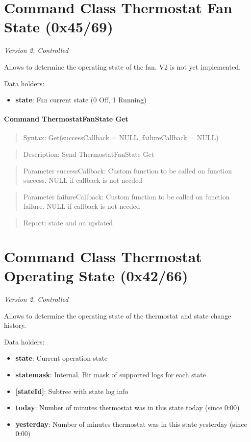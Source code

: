 \section{Command Class Thermostat Fan State (0x45/69)}

\textit{Version 2, Controlled}
\newline

Allows to determine the operating state of the fan. V2 is not yet implemented.
\newline

\noindent
Data holders:

\begin{itemize}
\item \textbf{state}: Fan current state (0 Off, 1 Running)
\end{itemize}

\paragraph{Command ThermostatFanState Get}
\begin{quote}Syntax: Get(successCallback = NULL, failureCallback = NULL)\end{quote}
\begin{quote}Description: Send ThermostatFanState Get\end{quote}
\begin{quote}Parameter successCallback: Custom function to be called on function success. NULL if callback is not needed\end{quote}
\begin{quote}Parameter failureCallback: Custom function to be called on function failure. NULL if callback is not needed\end{quote}
\begin{quote}Report: state and on updated\end{quote}


\section{Command Class Thermostat Operating State (0x42/66)}

\textit{Version 2, Controlled}
\newline

Allows to determine the operating state of the thermostat and state change history.
\newline

\noindent
Data holders:

\begin{itemize}
\item \textbf{state}: Current operation state
\item \textbf{statemask}: Internal. Bit mask of supported logs for each state
\item \textbf{[stateId]}: Subtree with state log info
\item \qquad\textbf{today}: Number of minutes thermostat was in this state today (since 0:00)
\item \qquad\textbf{yesterday}: Number of minutes thermostat was in this state yesterday (since 0:00)
\end{itemize}


